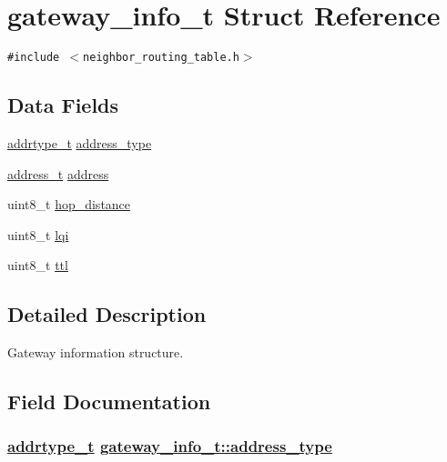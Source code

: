 \hypertarget{structgateway__info__t}{
\section{gateway\_\-info\_\-t Struct Reference}
\label{structgateway__info__t}
}
{\tt \#include $<$neighbor\_\-routing\_\-table.h$>$}

\subsection*{Data Fields}
\begin{CompactItemize}
\item 
\hyperlink{address_8h_faf76b5591da0abd0584dec411d0551d}{addrtype\_\-t} \hyperlink{structgateway__info__t_95a861899c3eea8087b0ce133de42d80}{address\_\-type}
\item 
\hyperlink{address_8h_65ce5a1faf29ab669a1d3dc6ce26c2ab}{address\_\-t} \hyperlink{structgateway__info__t_cf46061809e578c4acf9efe936340e6d}{address}
\item 
uint8\_\-t \hyperlink{structgateway__info__t_93b635756750f6abf21486d5b408e666}{hop\_\-distance}
\item 
uint8\_\-t \hyperlink{structgateway__info__t_4075557274a491d052944514dff46f47}{lqi}
\item 
uint8\_\-t \hyperlink{structgateway__info__t_bf2c4546f04ee1131d3ff827921844e0}{ttl}
\end{CompactItemize}


\subsection{Detailed Description}
Gateway information structure. 



\subsection{Field Documentation}
\hypertarget{structgateway__info__t_95a861899c3eea8087b0ce133de42d80}{
\subsubsection[address\_\-type]{\setlength{\rightskip}{0pt plus 5cm}\hyperlink{address_8h_faf76b5591da0abd0584dec411d0551d}{addrtype\_\-t} \hyperlink{structgateway__info__t_95a861899c3eea8087b0ce133de42d80}{gateway\_\-info\_\-t::address\_\-type}}}
\label{structgateway__info__t_95a861899c3eea8087b0ce133de42d80}


